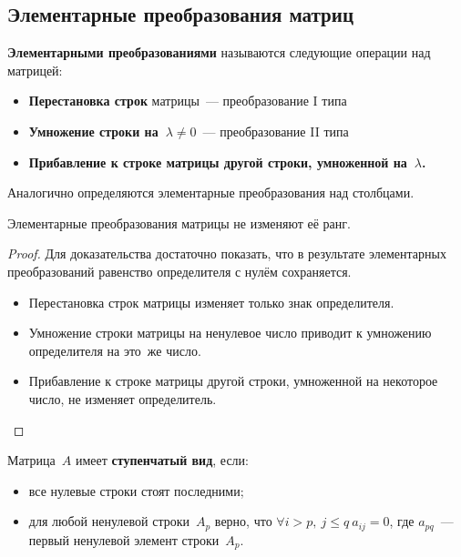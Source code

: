 \subsection{Элементарные преобразования матриц}
\textbf{Элементарными преобразованиями} называются следующие операции над матрицей:
\begin{itemize}
	\item\textbf{Перестановка строк} матрицы~--- преобразование I типа
	\item\textbf{Умножение строки на~$\lambda \neq 0$}~--- преобразование II типа
	\item\textbf{Прибавление к строке матрицы другой строки, умноженной на~$\lambda$.}
\end{itemize}

Аналогично определяются элементарные преобразования над столбцами.

\begin{theorem}
Элементарные преобразования матрицы не изменяют её ранг.
\end{theorem}
\begin{proof}
Для доказательства достаточно показать, что в результате элементарных преобразований равенство определителя с нулём сохраняется.
\begin{itemize}
	\item Перестановка строк матрицы изменяет только знак определителя.
	\item Умножение строки матрицы на ненулевое число приводит к умножению определителя на это~же число.
	\item Прибавление к строке матрицы другой строки, умноженной на некоторое число, не изменяет определитель.
\end{itemize}
\end{proof}

Матрица~$A$ имеет \textbf{ступенчатый вид}, если:
\begin{itemize}
	\item все нулевые строки стоят последними;
	\item для любой ненулевой строки~$A_p$ верно, что $\forall i > p, \ j \leqslant q \ a_{ij} = 0$, где $a_{pq}$~--- первый ненулевой элемент строки~$A_p$.
\end{itemize}


